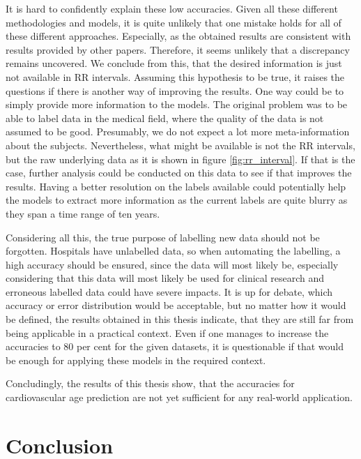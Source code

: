 \documentclass[11pt]{scrartcl}
\begin{document}
It is hard to confidently explain these low accuracies. Given all these different methodologies and models, it is quite unlikely that one mistake holds for all of these different approaches. Especially, as the obtained results are consistent with results provided by other papers. Therefore, it seems unlikely that a discrepancy remains uncovered. We conclude from this, that the desired information is just not available in RR intervals. Assuming this hypothesis to be true, it raises the questions if there is another way of improving the results. One way could be to simply provide more information to the models. The original problem was to be able to label data in the medical field, where the quality of the data is not assumed to be good. Presumably, we do not expect a lot more meta-information about the subjects. Nevertheless, what might be available is not the RR intervals, but the raw underlying data as it is shown in figure \ref{fig:rr_interval}. If that is the case, further analysis could be conducted on this data to see if that improves the results. Having a better resolution on the labels available could potentially help the models to extract more information as the current labels are quite blurry as they span a time range of ten years.

Considering all this, the true purpose of labelling new data should not be forgotten. Hospitals have unlabelled data, so when automating the labelling, a high accuracy should be ensured, since the data will most likely be, especially considering that this data will most likely be used for clinical research and erroneous labelled data could have severe impacts. It is up for debate, which accuracy or error distribution would be acceptable, but no matter how it would be defined, the results obtained in this thesis indicate, that they are still far from being applicable in a practical context. Even if one manages to increase the accuracies to 80 per cent for the given datasets, it is questionable if that would be enough for applying these models in the required context.

Concludingly, the results of this thesis show, that the accuracies for cardiovascular age prediction are not yet sufficient for any real-world application. 

\clearpage
\section{Conclusion}
\end{document}
